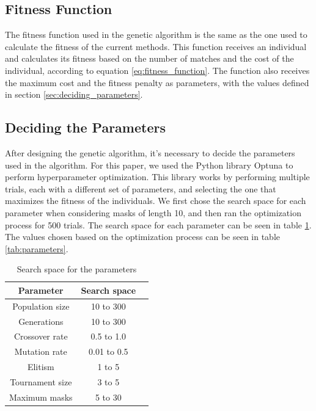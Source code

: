 \documentclass[sigconf,authordraft]{acmart}
\begin{document}
\subsection{Fitness Function}

The fitness function used in the genetic algorithm is the same as the one used to calculate the fitness of the current methods.
This function receives an individual and calculates its fitness based on the number of matches and the cost of the individual, according to equation \ref{eq:fitness_function}.
The function also receives the maximum cost and the fitness penalty as parameters, with the values defined in section \ref{sec:deciding_parameters}.

\subsection{Deciding the Parameters}

After designing the genetic algorithm, it's necessary to decide the parameters used in the algorithm.
For this paper, we used the Python library Optuna \cite{optuna} to perform hyperparameter optimization.
This library works by performing multiple trials, each with a different set of parameters, and selecting the one that maximizes the fitness of the individuals.
We first chose the search space for each parameter when considering masks of length 10, and then ran the optimization process for 500 trials.
The search space for each parameter can be seen in table \ref{tab:search_space}.
The values chosen based on the optimization process can be seen in table \ref{tab:parameters}.

\begin{table}
  \caption{Search space for the parameters}
  \label{tab:search_space}
  \begin{tabular}{ccl}
    \toprule
    Parameter & Search space \\
    \midrule
    Population size & 10 to 300 \\
    Generations & 10 to 300 \\
    Crossover rate & 0.5 to 1.0 \\
    Mutation rate & 0.01 to 0.5 \\
    Elitism & 1 to 5 \\
    Tournament size & 3 to 5 \\
    Maximum masks & 5 to 30 \\
    \bottomrule
  \end{tabular}
\end{table}
\end{document}
